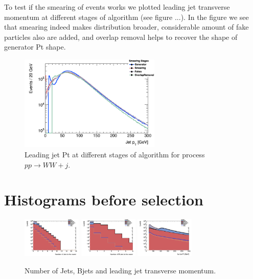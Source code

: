 \documentclass[tightenline,notitlepage,nofootinbib]{revtex4-1}
\begin{document}
To test if the smearing of events works we plotted leading jet transverse momentum at different stages of algorithm (see figure ...). In the figure we see that smearing indeed makes distribution broader, considerable amount of fake particles also are added, and overlap removal helps to recover the shape of generator Pt shape. 
\begin{figure}
  \includegraphics[width=0.6\textwidth]{h_PtJets1stStages.png}
  \caption{Leading jet Pt at different stages of algorithm for process $pp \rightarrow WW +j$.}
\end{figure}

\section{Histograms before selection}

\begin{figure}[!ht]
  \centering
  \includegraphics[width=0.25\textwidth]{h_NJet.png}
  \includegraphics[width=0.25\textwidth]{h_NBJet.png}
  \includegraphics[width=0.25\textwidth]{h_PtJets1st.png}
  \caption{Number of Jets, Bjets and leading jet transverse momentum.}
\end{figure}
\end{document}
